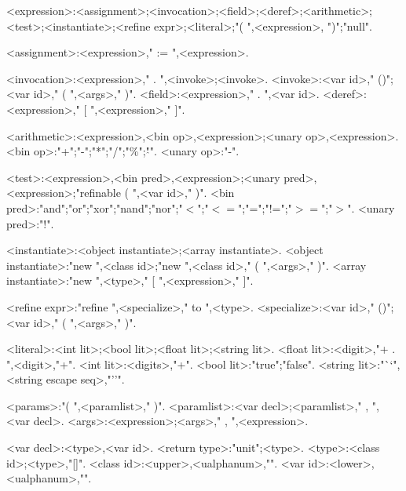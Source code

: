 \begin{grammar}
<expression>:<assignment>;<invocation>;<field>;<deref>;<arithmetic>;<test>;<instantiate>;<refine expr>;<literal>;"( ",<expression>, ")";"null".

<assignment>:<expression>," := ",<expression>.

<invocation>:<expression>," . ",<invoke>;<invoke>.
<invoke>:<var id>," ()";<var id>," ( ",<args>," )".
<field>:<expression>," . ",<var id>.
<deref>:<expression>," [ ",<expression>," ]".

<arithmetic>:<expression>,<bin op>,<expression>;<unary op>,<expression>.
<bin op>:"+";"-";"*";"/";"\%";"$\hat{}$".
<unary op>:"-".

<test>:<expression>,<bin pred>,<expression>;<unary pred>,<expression>;"refinable ( ",<var id>," )".
<bin pred>:"and";"or";"xor";"nand";"nor";"$<$";"$<=$";"=";"!=";"$>=$";"$>$".
<unary pred>:"!".

<instantiate>:<object instantiate>;<array instantiate>.
<object instantiate>:"new ",<class id>;"new ",<class id>," ( ",<args>," )".
<array instantiate>:"new ",<type>," [ ",<expression>," ]".

<refine expr>:"refine ",<specialize>," to ",<type>.
<specialize>:<var id>," ()";<var id>," ( ",<args>," )".

<literal>:<int lit>;<bool lit>;<float lit>;<string lit>.
<float lit>:<digit>,"{\small +} . ",<digit>,"{\small +}".
<int lit>:<digits>,"{\small +}".
<bool lit>:"true";"false".
<string lit>:"``",<string escape seq>,"''".

<params>:"( ",<paramlist>," )".
<paramlist>:<var decl>;<paramlist>," , ",<var decl>.
<args>:<expression>;<args>," , ",<expression>.

<var decl>:<type>,<var id>.
<return type>:"unit";<type>.
<type>:<class id>;<type>,"[]".
<class id>:<upper>,<ualphanum>,"{\small *}".
<var id>:<lower>,<ualphanum>,"{\small *}".

\end{grammar}
